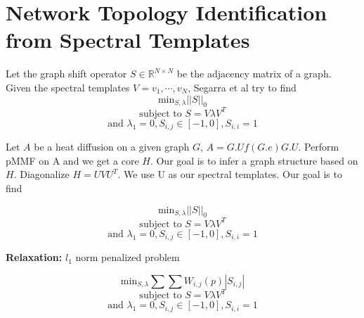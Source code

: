 \documentclass[a4paper]{article}
\newcommand{\R}{\mathbb{R}}
\begin{document}
\section{Network Topology Identification from Spectral Templates}

Let the graph shift operator $S \in \R^{N\times N}$ be the adjacency matrix of a graph. Given the spectral templates $V = {v_1, \cdots, v_N}$, Segarra et al try to find
$$\text{min}_{S, \lambda} ||S||_0 $$
$$\text{subject to } S = V\lambda V^T $$
$$\text{and } \lambda_{1} =0, S_{i,j} \in [-1,0], S_{i,i} =1$$

Let $A$ be a heat diffusion on a given graph $G$, $A = G.Uf(G.e)G.U$. Perform pMMF on A and we get a core $H$. Our goal is to infer a graph structure based on $H$. Diagonalize $H = UVU^T$. We use U as our spectral templates. Our goal is to find

$$\text{min}_{S, \lambda} ||S||_0 $$
$$\text{subject to } S = V\lambda V^T $$
$$\text{and } \lambda_{1} =0, S_{i,j} \in [-1,0], S_{i,i} =1$$

\textbf{Relaxation:} $l_1$ norm penalized problem

$$\text{min}_{S, \lambda} \sum\sum W_{i,j}(p)|S_{i,j}| $$
$$\text{subject to } S = V\lambda V^T $$
$$\text{and } \lambda_{1} =0, S_{i,j} \in [-1,0], S_{i,i} =1$$

\end{document}
